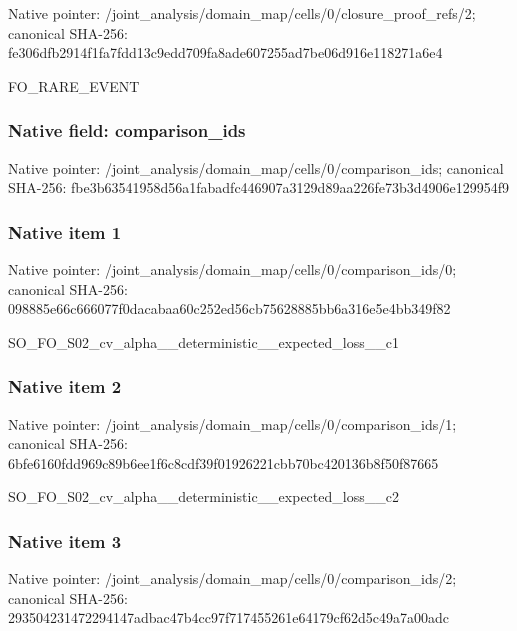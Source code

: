 \documentclass[10pt,a4paper]{article}
\begin{document}
Native pointer: /joint\_analysis/domain\_m\allowbreak{}ap/cells/0/closure\_proof\allowbreak{}\_refs/2; canonical SHA-256: fe306dfb2914f1fa7fdd13c9\allowbreak{}edd709fa8ade607255ad7be0\allowbreak{}6d916e118271a6e4


FO\_RARE\_EVENT


\subsubsection{Native field: comparison\_ids}


Native pointer: /joint\_analysis/domain\_m\allowbreak{}ap/cells/0/comparison\_id\allowbreak{}s; canonical SHA-256: fbe3b63541958d56a1fabadf\allowbreak{}c446907a3129d89aa226fe73\allowbreak{}b3d4906e129954f9



\subsubsection{Native item 1}


Native pointer: /joint\_analysis/domain\_m\allowbreak{}ap/cells/0/comparison\_id\allowbreak{}s/0; canonical SHA-256: 098885e66c666077f0dacaba\allowbreak{}a60c252ed56cb75628885bb6\allowbreak{}a316e5e4bb349f82


SO\_FO\_S02\_cv\_alpha\_\_dete\allowbreak{}rministic\_\_expected\_loss\allowbreak{}\_\_c1


\subsubsection{Native item 2}


Native pointer: /joint\_analysis/domain\_m\allowbreak{}ap/cells/0/comparison\_id\allowbreak{}s/1; canonical SHA-256: 6bfe6160fdd969c89b6ee1f6\allowbreak{}c8cdf39f01926221cbb70bc4\allowbreak{}20136b8f50f87665


SO\_FO\_S02\_cv\_alpha\_\_dete\allowbreak{}rministic\_\_expected\_loss\allowbreak{}\_\_c2


\subsubsection{Native item 3}


Native pointer: /joint\_analysis/domain\_m\allowbreak{}ap/cells/0/comparison\_id\allowbreak{}s/2; canonical SHA-256: 293504231472294147adbac4\allowbreak{}7b4cc97f717455261e64179c\allowbreak{}f62d5c49a7a00adc
\end{document}
